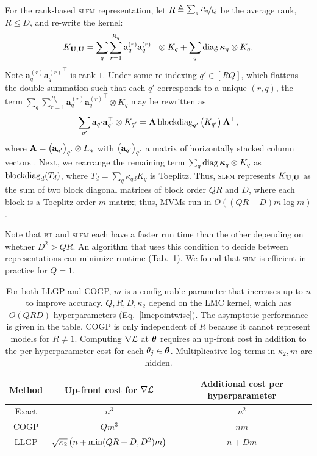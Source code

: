 \documentclass{article}
\begin{document}
For the rank-based \textsc{slfm} representation, let $R\triangleq \nicefrac{\sum_qR_q}{Q}$ be the average rank, $R\le D$, and re-write the kernel:
\begin{align*}
  K_{\textbf{U},\textbf{U}}=\sum_q\sum_{r=1}^{R_q}\textbf{a}_q^{(r)}{\textbf{a}_q^{(r)}}^\top\otimes K_q + \sum_q\operatorname{diag}{\boldsymbol\kappa}_q \otimes K_q.
\end{align*}
Note $\textbf{a}_q^{(r)}{\textbf{a}_q^{(r)}}^\top$ is rank $1$. Under some re-indexing $q'\in[RQ]$, which flattens the double summation such that each $q'$ corresponds to a unique $(r, q)$, the term $\sum_q\sum_{r=1}^{R_q}\textbf{a}_q^{(r)}{\textbf{a}_q^{(r)}}^\top\otimes K_q $ may be rewritten as
\begin{align*}
  \sum_{q'}\textbf{a}_{q'}\textbf{a}_{q'}^\top\otimes K_{q'} = \textbf{A}\operatorname{blockdiag}_{q'}\begin{pmatrix} K_{q'} \end{pmatrix}\textbf{A}^\top,
\end{align*}
where $\textbf{A}=\begin{pmatrix}  \textbf{a}_{q'} \end{pmatrix}_{q'}\otimes I_m$ with $\begin{pmatrix}  \textbf{a}_{q'} \end{pmatrix}_{q'}$ a matrix of horizontally stacked column vectors \cite{seeger2005semiparametric}. Next, we rearrange the remaining term $\sum_q\operatorname{diag}{\boldsymbol\kappa}_q \otimes K_q$ as $\operatorname{blockdiag}_d(T_d)$, where $T_d=\sum_q \kappa_{qd}K_q$ is Toeplitz. Thus, \textsc{slfm} represents $K_{\textbf{U},\textbf{U}}$ as the sum of two block diagonal matrices of block order $QR$ and $D$, where each block is a Toeplitz order $m$ matrix; thus, MVMs run in $O((QR + D)m\log m)$.

Note that \textsc{bt} and \textsc{slfm} each have a faster run time than the other depending on whether $D^2>QR$. An algorithm that uses this condition to decide between representations can minimize runtime (Tab.~\ref{asymp}). We found that \textsc{sum} is efficient in practice for $Q=1$.

\begin{table}[!h]
  \caption{
   For both LLGP and COGP, $m$ is a configurable parameter that increases up to $n$ to improve accuracy. $Q,R,D,\kappa_2$ depend on the LMC kernel, which has $O(QRD)$ hyperparameters (Eq.~\ref{lmcpointwise}). The asymptotic performance is given in the table. COGP is only independent of $R$ because it cannot represent models for $R\neq 1$. Computing $\nabla\mathcal{L}$ at ${\boldsymbol\theta}$ requires an up-front cost in addition to the per-hyperparameter cost for each $\theta_j\in{\boldsymbol\theta}$. Multiplicative log terms in $\kappa_2, m$ are hidden.
  }
\label{asymp}
\begin{sc}
\begin{center}
\begin{small}
\begin{tabular}{ccc}
  \toprule
  Method & Up-front cost for $\nabla \mathcal{L}$ & Additional cost per hyperparameter\\
  \midrule
  Exact & $n^3$ & $n^2 $\\
  COGP & $Qm^3$ & $nm$ \\
  LLGP & $\sqrt{\kappa_2} \left({n +\min(QR+D, D^2) m}\right)$ &  $n + D m$ \\
  \bottomrule
\end{tabular}
\end{small}
\end{center}
\end{sc}
\end{table}
\end{document}
